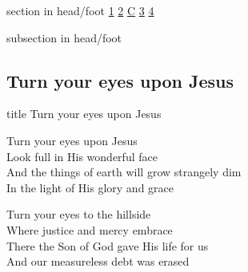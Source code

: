\documentclass{beamer}
\begin{document}
{
{ 
 {
 \begin{beamercolorbox}[ht=4.5ex,dp=1.5ex,%
      leftskip=.3cm,rightskip=.3cm plus1fil]{section in head/foot}
 \fontsize{12}{25}\selectfont 
\hyperlink{Turn your eyes upon Jesus[]1}{1}
\hyperlink{Turn your eyes upon Jesus[]2}{2}
\hyperlink{Turn your eyes upon Jesus[]C}{C}
\hyperlink{Turn your eyes upon Jesus[]3}{3}
\hyperlink{Turn your eyes upon Jesus[]4}{4}
 
 \end{beamercolorbox}%
  \begin{beamercolorbox}[ht=2.5ex,dp=1.125ex,%
   leftskip=.3cm,rightskip=.3cm plus1fil]{subsection in head/foot}
   \insertauthor
 \end{beamercolorbox}%
 }
}
\subsection{ Turn your eyes upon Jesus }

\hypertarget{Turn your eyes upon Jesus[]}{}
\begin{frame}{}
 \vfill
  \centering
  \begin{beamercolorbox}[sep=8pt,center,shadow=true,rounded=true]{title}
    Turn your eyes upon Jesus     
  \end{beamercolorbox}
  \vfill
\end{frame}

\hypertarget{Turn your eyes upon Jesus[]1}{}
\begin{frame}{}
\fontsize{ 15 }{ 19 }\selectfont

Turn your eyes upon Jesus\\ 
Look full in His wonderful face\\ 
And the things of earth will grow strangely dim\\ 
In the light of His glory and grace 

\end{frame}

\hypertarget{Turn your eyes upon Jesus[]2}{}
\begin{frame}{}
\fontsize{ 15 }{ 19 }\selectfont

Turn your eyes to the hillside\\ 
Where justice and mercy embrace\\ 
There the Son of God gave His life for us\\ 
And our measureless debt was erased 


\end{frame}}
\end{document}
